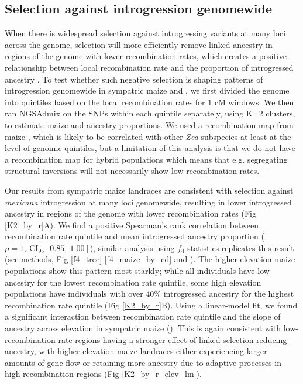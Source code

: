 \subsection*{Selection against introgression genomewide} 
When there is widespread selection against introgressing variants at many loci across the genome, selection will more efficiently remove linked ancestry in regions of the genome with lower recombination rates, which creates a positive relationship between local recombination rate and the proportion of introgressed ancestry \cite{Veller:2019ge, Schumer:2018hc, Harris:2016fp, Juric:2016jj, Sankararaman:2014_neanderthals, Brandvain:2014cq, Aeschbacher:2017_mimulus, Kenney_Sweigart:2016_mimulus, Nelson:2021_mimulus, Martin:2019_butterflies, Edelman:2019_butterfly}.
To test whether such negative selection is shaping patterns of introgression genomewide in sympatric maize and \mexicana, we first divided the genome into quintiles based on the local recombination rates for 1 cM windows. 
We then ran NGSAdmix on the SNPs within each quintile separately, using K=2 clusters, to estimate maize and \mexicana ancestry proportions. We used a recombination map from maize \cite{Ogut:2015df}, which is likely to be correlated with other \textit{Zea} subspecies at least at the level of genomic quintiles, but a limitation of this analysis is that we do not have a recombination map for hybrid populations which means that e.g. segregating structural inversions will not necessarily show low recombination rates.

Our results from sympatric maize landraces are consistent with selection against \textit{mexicana} introgression at many loci genomewide, resulting in lower introgressed ancestry in regions of the genome with lower recombination rates (Fig \ref{K2_by_r}A). 
We find a positive Spearman's rank correlation between recombination rate quintile and mean introgressed \mexicana ancestry proportion ($\rho = 1,\ \text{CI}_{95}[0.85,\ 1.00]$),    similar analysis using $f_4$ statistics replicates this result (see methods, Fig \ref{f4_tree}-\ref{f4_maize_by_cd} and ). The higher elevation maize populations show this pattern most starkly; while all individuals have low \mexicana ancestry for the lowest recombination rate quintile, some high elevation populations have individuals with over 40\% introgressed ancestry for the highest recombination rate quintile (Fig \ref{K2_by_r}B). Using a linear-model fit, we found a significant interaction between recombination rate quintile and the slope of ancestry across elevation  in sympatric maize (). 
This is again consistent with low-recombination rate regions having a stronger effect of linked selection reducing \mexicana ancestry, with higher elevation maize landraces either experiencing larger amounts of gene flow or retaining more ancestry due to adaptive processes in high recombination regions (Fig \ref{K2_by_r_elev_lm}).


